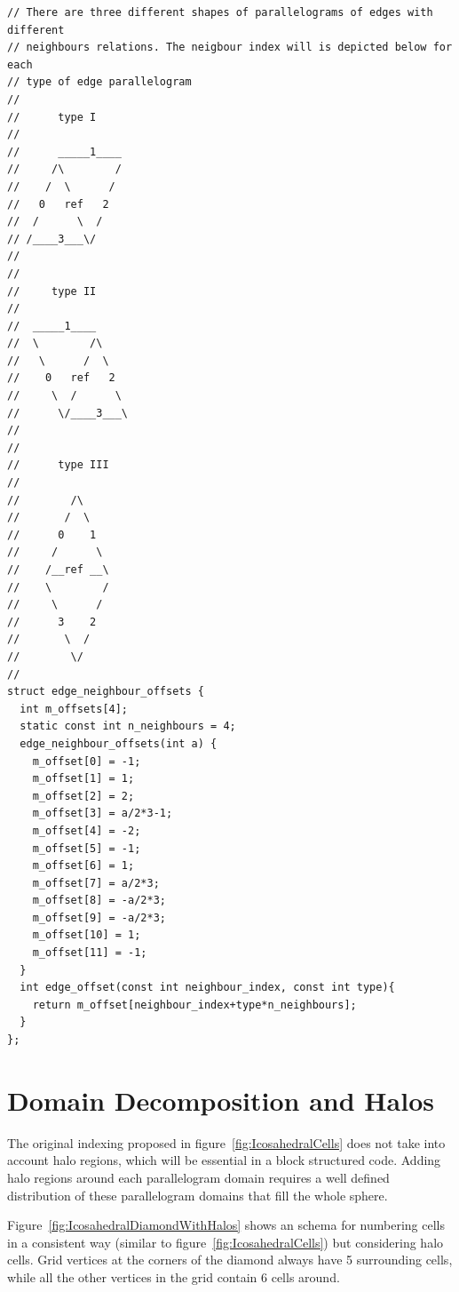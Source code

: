 \documentclass{book}
\begin{document}
\begin{verbatim}
// There are three different shapes of parallelograms of edges with different
// neighbours relations. The neigbour index will is depicted below for each
// type of edge parallelogram
// 
//      type I
//
//      _____1____
//     /\        /
//    /  \      /
//   0   ref   2
//  /      \  /
// /____3___\/ 
//
// 
//     type II
//
//  _____1____
//  \        /\
//   \      /  \
//    0   ref   2 
//     \  /      \
//      \/____3___\
//
//
//      type III
//
//        /\
//       /  \
//      0    1
//     /      \
//    /__ref __\
//    \        /
//     \      /
//      3    2
//       \  /
//        \/
//
struct edge_neighbour_offsets {
  int m_offsets[4];
  static const int n_neighbours = 4;
  edge_neighbour_offsets(int a) {
    m_offset[0] = -1;
    m_offset[1] = 1;
    m_offset[2] = 2;
    m_offset[3] = a/2*3-1;
    m_offset[4] = -2;
    m_offset[5] = -1;
    m_offset[6] = 1;
    m_offset[7] = a/2*3;
    m_offset[8] = -a/2*3;
    m_offset[9] = -a/2*3;
    m_offset[10] = 1;
    m_offset[11] = -1;
  }
  int edge_offset(const int neighbour_index, const int type){
    return m_offset[neighbour_index+type*n_neighbours];
  }
};
\end{verbatim}

\section{Domain Decomposition and Halos}

The original indexing proposed in figure~\ref{fig:IcosahedralCells} does not take into account halo regions, which will be essential in a block structured code.
Adding halo regions around each parallelogram domain requires a well defined distribution of
these parallelogram domains that fill the whole sphere. 

Figure~\ref{fig:IcosahedralDiamondWithHalos} shows an schema for numbering
cells 
in a consistent way (similar to figure~\ref{fig:IcosahedralCells}) but considering
halo cells.
Grid vertices at the corners of the diamond always have 5 surrounding cells, while
all the other vertices in the grid contain 6 cells around.
\end{document}
